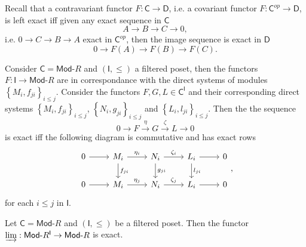 \begin{rem}
	Recall that a contravariant functor $F: \mathsf{C} \to \mathsf{D}$, i.e. a covariant functor $F: \mathsf{C}^{op} \to \mathsf{D}$, 
	is left exact iff given any exact sequence in $\mathsf{C}$ 
	\begin{equation}
	A \to B \to C \to 0
	,\end{equation} 
	i.e. $0 \to C \to B \to A$ exact in $\mathsf{C}^{op}$, then the image sequence is exact in $\mathsf{D}$
	\begin{equation}
		0 \to F(A) \to F(B) \to F(C)
	.\end{equation} 
\end{rem}
\begin{rem}
Consider $\mathsf{C} = \mathsf{Mod}\text{-}R$ and $\left(\mathsf{I}, \leq \right)$ a filtered poset, then
the functors $F: \mathsf{I} \to \mathsf{Mod}\text{-}R$ are in correspondance with the direct systems of modules
$\left\{ M_i, f_{ji} \right\}_{i \leq j }$.
Consider the functors $F, G, L \in \mathsf{C}^{\mathsf{I}}$ and their corresponding
direct systems $\left\{ M_i, f_{ji} \right\}_{i \leq j}$, $\left\{ N_i, g_{ji} \right\}_{i \leq j}$ and $\left\{ L_i, l_{ji} \right\}_{i \leq j}$.
Then the the sequence 
\begin{equation}
0 \to F \xrightarrow{\eta} G \xrightarrow{\zeta} L \to 0
\end{equation} 
is exact iff the following diagram is commutative and has exact rows
\begin{equation}
\begin{tikzcd}
	0 \arrow[r, "", rightarrow] &
	M_i \arrow[r, "\eta_i", rightarrow] \arrow[d, "f_{ji}", rightarrow] &
	N_i \arrow[r, "\zeta_i", rightarrow] \arrow[d, "g_{ji}", rightarrow] &
	L_i \arrow[r, "", rightarrow] \arrow[d, "l_{ji}", rightarrow] &
	0 \\
	0 \arrow[r, "", rightarrow] &
	M_i \arrow[r, "\eta_j", rightarrow] &
	N_i \arrow[r, "\zeta_j", rightarrow] &
	L_i \arrow[r, "", rightarrow] &
	0
\end{tikzcd}
,\end{equation} 
for each $i \leq j$ in $\mathsf{I}$.
\end{rem} 

\begin{prop}
	Let $\mathsf{C} = \mathsf{Mod}\text{-}R$ and $\left(\mathsf{I}, \leq \right)$ be a filtered poset.
	Then the functor $\varinjlim: \mathsf{Mod}\text{-}R^{\mathsf{I}} \to \mathsf{Mod}\text{-}R$ is exact.
\end{prop} 

